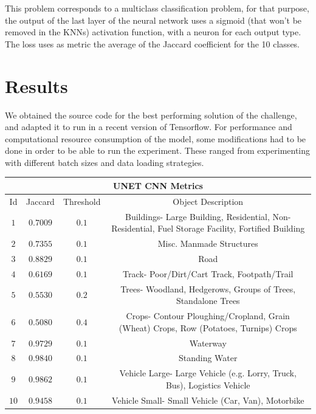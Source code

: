 \documentclass{article}
\begin{document}
This problem corresponds to a multiclass classification problem, for that purpose, the output of the last layer of the neural network uses a sigmoid (that won't be removed in the KNNs) activation function, with a neuron for each output type. The loss uses as metric the average of the Jaccard coefficient for the 10 classes.\\

\section{Results}

We obtained the source code for the best performing solution of the challenge, and adapted it to run in a recent version of Tensorflow. For performance and computational resource consumption of the model, some modifications had to be done in order to be able to run the experiment. These ranged from experimenting with different batch sizes and data loading strategies.

\begin{center}
 \begin{tabular}{ |c|c|c|c| } 
 \hline
 \multicolumn{4}{|c|}{UNET CNN Metrics}\\
 \hline
 \hline
 Id & Jaccard & Threshold & Object Description \\  
 \hline
 \hline
$1$ & $0.7009$ & $0.1$ & \scriptsize Buildings- Large Building, Residential, Non-Residential, Fuel Storage Facility, Fortified Building\\
\hline
$2$ & $0.7355$ & $0.1$ & \scriptsize Misc. Manmade Structures\\
\hline
$3$ & $0.8829$ & $0.1$ & \scriptsize Road\\
\hline
$4$ & $0.6169$ & $0.1$ & \scriptsize Track- Poor/Dirt/Cart Track, Footpath/Trail\\
\hline
$5$ & $0.5530$ & $0.2$ & \scriptsize Trees- Woodland, Hedgerows, Groups of Trees, Standalone Trees\\
\hline
$6$ & $0.5080$ & $0.4$ & \scriptsize Crops- Contour Ploughing/Cropland, Grain (Wheat) Crops, Row (Potatoes, Turnips) Crops\\
\hline
$7$ & $0.9729$ & $0.1$ & \scriptsize Waterway\\
\hline
$8$ & $0.9840$ & $0.1$ & \scriptsize Standing Water\\
\hline
$9$ & $0.9862$ & $0.1$ & \scriptsize Vehicle Large- Large Vehicle (e.g. Lorry, Truck, Bus), Logistics Vehicle\\
\hline
$10$ & $0.9458$ & $0.1$ & \scriptsize Vehicle Small- Small Vehicle (Car, Van), Motorbike\\
\hline
\end{tabular}
\end{center}
\end{document}
